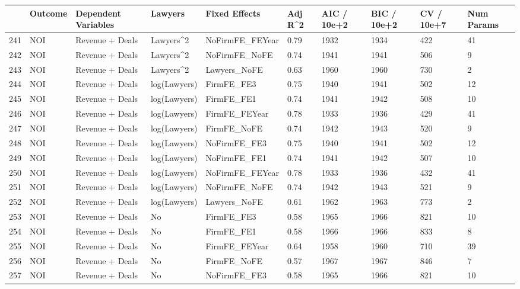 \begin{table}[ht]
\centering
\begin{tabular}{rlllllllll}
  \hline
 & Outcome & Dependent Variables & Lawyers & Fixed Effects & Adj R^2 & AIC / 10e+2 & BIC / 10e+2 & CV / 10e+7 & Num Params \\ 
  \hline
241 & NOI & Revenue + Deals & Lawyers^2 & NoFirmFE\_FEYear & 0.79 & 1932 & 1934 & 422 & 41 \\ 
  242 & NOI & Revenue + Deals & Lawyers^2 & NoFirmFE\_NoFE & 0.74 & 1941 & 1941 & 506 & 9 \\ 
  243 & NOI & Revenue + Deals & Lawyers^2 & Lawyers\_NoFE & 0.63 & 1960 & 1960 & 730 & 2 \\ 
  244 & NOI & Revenue + Deals & log(Lawyers) & FirmFE\_FE3 & 0.75 & 1940 & 1941 & 502 & 12 \\ 
  245 & NOI & Revenue + Deals & log(Lawyers) & FirmFE\_FE1 & 0.74 & 1941 & 1942 & 508 & 10 \\ 
  246 & NOI & Revenue + Deals & log(Lawyers) & FirmFE\_FEYear & 0.78 & 1933 & 1936 & 429 & 41 \\ 
  247 & NOI & Revenue + Deals & log(Lawyers) & FirmFE\_NoFE & 0.74 & 1942 & 1943 & 520 & 9 \\ 
  248 & NOI & Revenue + Deals & log(Lawyers) & NoFirmFE\_FE3 & 0.75 & 1940 & 1941 & 502 & 12 \\ 
  249 & NOI & Revenue + Deals & log(Lawyers) & NoFirmFE\_FE1 & 0.74 & 1941 & 1942 & 507 & 10 \\ 
  250 & NOI & Revenue + Deals & log(Lawyers) & NoFirmFE\_FEYear & 0.78 & 1933 & 1936 & 432 & 41 \\ 
  251 & NOI & Revenue + Deals & log(Lawyers) & NoFirmFE\_NoFE & 0.74 & 1942 & 1943 & 521 & 9 \\ 
  252 & NOI & Revenue + Deals & log(Lawyers) & Lawyers\_NoFE & 0.61 & 1962 & 1963 & 773 & 2 \\ 
  253 & NOI & Revenue + Deals & No & FirmFE\_FE3 & 0.58 & 1965 & 1966 & 821 & 10 \\ 
  254 & NOI & Revenue + Deals & No & FirmFE\_FE1 & 0.58 & 1966 & 1966 & 833 & 8 \\ 
  255 & NOI & Revenue + Deals & No & FirmFE\_FEYear & 0.64 & 1958 & 1960 & 710 & 39 \\ 
  256 & NOI & Revenue + Deals & No & FirmFE\_NoFE & 0.57 & 1967 & 1967 & 846 & 7 \\ 
  257 & NOI & Revenue + Deals & No & NoFirmFE\_FE3 & 0.58 & 1965 & 1966 & 821 & 10 \\ 

\end{tabular}
\end{table}
